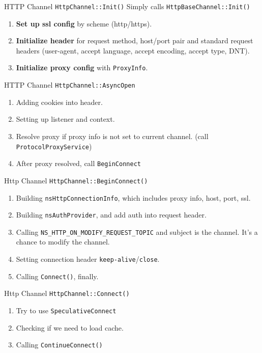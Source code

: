\documentclass{beamer}
\begin{document}
\begin{frame}{HTTP Channel}
  \texttt{HttpChannel::Init()}  Simply calls \texttt{HttpBaseChannel::Init()}
  \begin{enumerate}
  \item \textbf{Set up ssl config} by scheme (http/https).
  \item \textbf{Initialize header} for request method, host/port pair and standard request headers (user-agent, accept language, accept encoding, accept type, DNT).
  \item \textbf{Initialize proxy config} with \texttt{ProxyInfo}.
  \end{enumerate}
\end{frame}

\begin{frame}{HTTP Channel}
  \texttt{HttpChannel::AsyncOpen}
  \begin{enumerate}
  \item Adding cookies into header.
  \item Setting up listener and context.
  \item Resolve proxy if proxy info is not set to current channel. (call \texttt{ProtocolProxyService})
  \item After proxy resolved, call \texttt{BeginConnect}
  \end{enumerate}
\end{frame}

\begin{frame}{Http Channel}
  \texttt{HttpChannel::BeginConnect()}
  \begin{enumerate}
    \item Building \texttt{nsHttpConnectionInfo}, which includes proxy info, host, port, ssl.
    \item Building \texttt{nsAuthProvider}, and add auth into request header.
    \item Calling \texttt{NS\_HTTP\_ON\_MODIFY\_REQUEST\_TOPIC} and subject is the channel. It's a chance to modify the channel.
    \item Setting connection header \texttt{keep-alive}/\texttt{close}.
    \item Calling \texttt{Connect()}, finally.
  \end{enumerate}
\end{frame}

\begin{frame}{Http Channel}
  \texttt{HttpChannel::Connect()}
  \begin{enumerate}
  \item Try to use \texttt{SpeculativeConnect}
  \item Checking if we need to load cache.
  \item Calling \texttt{ContinueConnect()}
  \end{enumerate}
\end{frame}
\end{document}
